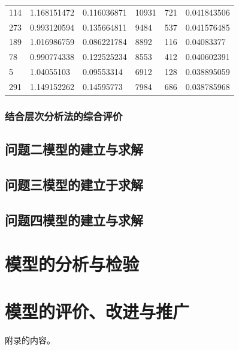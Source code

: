 \documentclass{cumcmthesis}
\begin{document}
\begin{longtable}{l|llll|l}
    114 & 1.168151472 & 0.116036871 & 10931  & 721     & 0.041843506 \\
    273 & 0.993120594 & 0.135664811 & 9484   & 537     & 0.041576485 \\
    189 & 1.016986759 & 0.086221784 & 8892   & 116     & 0.04083377  \\
    78  & 0.990774338 & 0.122525234 & 8553   & 412     & 0.040602391 \\
    5   & 1.04055103  & 0.09553314  & 6912   & 128     & 0.038895059 \\
    291 & 1.149152262 & 0.14595773  & 7984   & 686     & 0.038785968\\
    \bottomrule
    \end{longtable}

\subsubsection{结合层次分析法的综合评价}
\subsection{问题二模型的建立与求解}
\subsection{问题三模型的建立于求解}
\subsection{问题四模型的建立与求解}
\section{模型的分析与检验}
\section{模型的评价、改进与推广}




\begin{appendices}附录的内容。
\end{appendices}
\end{document}
